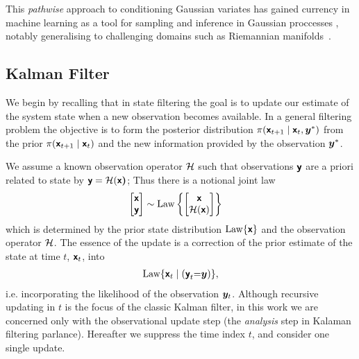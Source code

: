 \documentclass{article}
\begin{document}
This \emph{pathwise} approach to conditioning Gaussian variates has gained currency in machine learning as a tool for sampling and inference in Gaussian proccesses \citep{Wilson2020Efficiently,Wilson2021Pathwise}, notably generalising to challenging domains such as Riemannian manifolds~\citep{Borovitskiy2020Matern}.


\subsection{Kalman Filter}
We begin by recalling that in state filtering the goal is to update our estimate of the system state when a new observation becomes available. In a general filtering problem the objective is to form the posterior distribution \(\pi(\boldsymbol{\mathsf{x}}_{t+1} \mid \boldsymbol{\mathsf{x}}_t, \boldsymbol{y}^*)\) from the prior \(\pi(\boldsymbol{\mathsf{x}}_{t+1} \mid \boldsymbol{\mathsf{x}}_t)\) and the new information provided by the observation \(\boldsymbol{y}^*\).

We assume a known observation operator $\mathcal{H}$ such that observations $\boldsymbol{\mathsf{y}}$ are a priori related to state  by $\boldsymbol{\mathsf{y}}=\mathcal{H}(\boldsymbol{\mathsf{x}}\boldsymbol{\mathsf{)}}$; Thus there is a notional joint law
\begin{align}
    \begin{bmatrix}
        \boldsymbol{\mathsf{x}}\\
        \boldsymbol{\mathsf{y}}
    \end{bmatrix} &\sim\operatorname{Law} \left\{ \begin{bmatrix}
        \boldsymbol{\mathsf{x}}\\
        \mathcal{H}(\boldsymbol{\mathsf{x}})
    \end{bmatrix}\right\}\label{eq:joint-law}
\end{align}
which is determined by the prior state distribution $\operatorname{Law}\{\boldsymbol{\mathsf{x}}\}$ and the observation operator $\mathcal{H}$.
The essence of the update is  a correction of the prior estimate of the state at time $t$, \(\boldsymbol{\mathsf{x}}_{t}\), into
\begin{align}
    \operatorname{Law}\{\boldsymbol{\mathsf{x}}_t \mid (\boldsymbol{\mathsf{y}}_t{=}\boldsymbol{y})\},
\end{align}
i.e. incorporating the likelihood of the observation $\boldsymbol{y}_t$.
Although  recursive updating in $t$ is the focus of the classic Kalman filter, in this work we are concerned only with the observational update step (the \emph {analysis} step in Kalaman filtering parlance).
Hereafter we suppress the time index $t$, and consider one single update.
\end{document}

